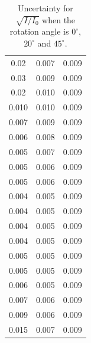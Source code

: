 \documentclass[a4paper]{article}
\begin{document}
\begin{table}[H]
\begin{tabular}{ccc}
		0.02                      & 0.007                      & 0.009                      \\
		0.03                      & 0.009                      & 0.009                      \\
		0.02                      & 0.010                      & 0.009                      \\
		0.010                     & 0.010                      & 0.009                      \\
		0.007                     & 0.009                      & 0.009                      \\
		0.006                     & 0.008                      & 0.009                      \\
		0.005                     & 0.007                      & 0.009                      \\
		0.005                     & 0.006                      & 0.009                      \\
		0.005                     & 0.006                      & 0.009                      \\
		0.004                     & 0.005                      & 0.009                      \\
		0.004                     & 0.005                      & 0.009                      \\
		0.004                     & 0.005                      & 0.009                      \\
		0.004                     & 0.005                      & 0.009                      \\
		0.005                     & 0.005                      & 0.009                      \\
		0.005                     & 0.005                      & 0.009                      \\
		0.006                     & 0.005                      & 0.009                      \\
		0.007                     & 0.006                      & 0.009                      \\
		0.009                     & 0.006                      & 0.009                      \\
		0.015                     & 0.007                      & 0.009                      \\
		\hline
	\end{tabular}
	\caption{Uncertainty for $\sqrt{I/I_0}$ when the rotation angle is $0^\circ$, $20^\circ$ and $45^\circ$.}\label{TableUnc1/4}
\end{table}
\end{document}
